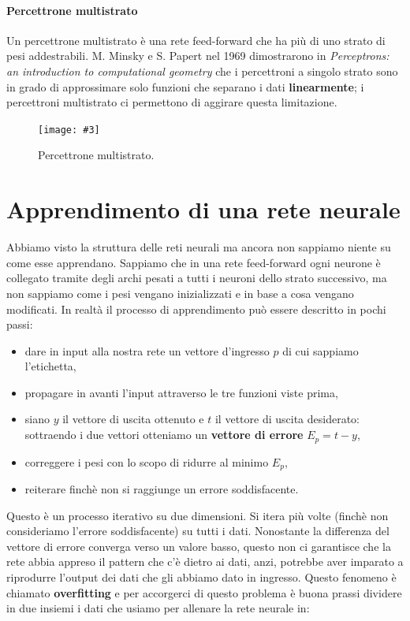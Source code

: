 \documentclass[12pt, twoside, letterpaper]{report}
\newcommand{\img}[4] {
	\begin{figure}
		\centering
		\texttt{[image: \#3]}\\
		\caption{#1}
		\label{#4}
	\end{figure}
}
\begin{document}
			\paragraph{Percettrone multistrato} Un percettrone multistrato è una rete feed-forward che ha più di uno strato di pesi addestrabili. M. Minsky e S. Papert nel 1969 dimostrarono in \textit{Perceptrons: an introduction to computational geometry} che i percettroni a singolo strato sono in grado di approssimare solo funzioni che separano i dati \textbf{linearmente}; i percettroni multistrato ci permettono di aggirare questa limitazione. 
				\img{Percettrone multistrato. \cite{kriesel}}{0.5}{nn-feed-forward.png}{feedforward}
		
		\section{Apprendimento di una rete neurale}
			Abbiamo visto la struttura delle reti neurali ma ancora non sappiamo niente su come esse apprendano. Sappiamo che in una rete feed-forward ogni neurone è collegato tramite degli archi pesati a tutti i neuroni dello strato successivo, ma non sappiamo come i pesi vengano inizializzati e in base a cosa vengano modificati. In realtà il processo di apprendimento può essere descritto in pochi passi: 
			\begin{itemize}
				\item dare in input alla nostra rete un vettore d'ingresso $p$ di cui sappiamo l'etichetta,
				\item propagare in avanti l'input attraverso le tre funzioni viste prima, %
				\item siano $y$ il vettore di uscita ottenuto e $t$ il vettore di uscita desiderato: sottraendo i due vettori otteniamo un \textbf{vettore di errore} $E_p = t - y$,
				\item correggere i pesi con lo scopo di ridurre al minimo $E_p$,
				\item reiterare finchè non si raggiunge un errore soddisfacente.
			\end{itemize}
			Questo è un processo iterativo su due dimensioni. Si itera più volte (finchè non consideriamo l'errore soddisfacente) su tutti i dati. Nonostante la differenza del vettore di errore converga verso un valore basso, questo non ci garantisce che la rete abbia appreso il pattern che c'è dietro ai dati, anzi, potrebbe aver imparato a riprodurre l'output dei dati che gli abbiamo dato in ingresso. Questo fenomeno è chiamato \textbf{overfitting} e per accorgerci di questo problema è buona prassi dividere in due insiemi i dati che usiamo per allenare la rete neurale in: 
\end{document}
